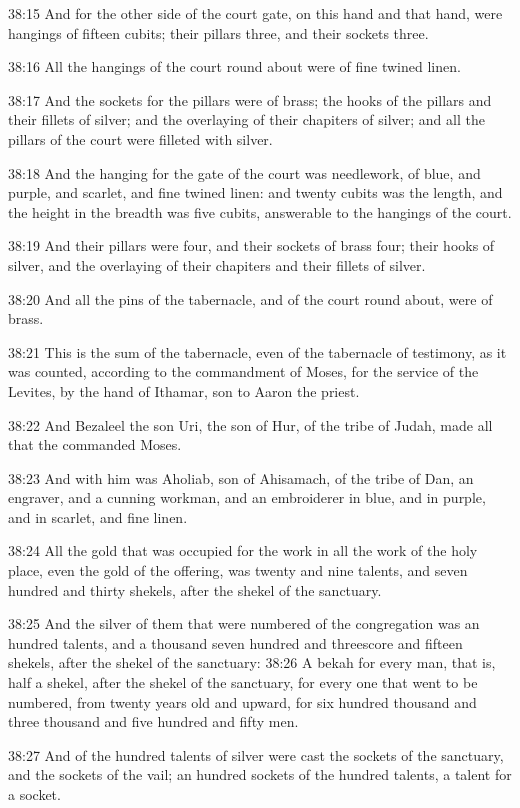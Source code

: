 38:15 And for the other side of the court gate, on this hand and that
hand, were hangings of fifteen cubits; their pillars three, and their
sockets three.

38:16 All the hangings of the court round about were of fine twined
linen.

38:17 And the sockets for the pillars were of brass; the hooks of the
pillars and their fillets of silver; and the overlaying of their
chapiters of silver; and all the pillars of the court were filleted
with silver.

38:18 And the hanging for the gate of the court was needlework, of
blue, and purple, and scarlet, and fine twined linen: and twenty
cubits was the length, and the height in the breadth was five cubits,
answerable to the hangings of the court.

38:19 And their pillars were four, and their sockets of brass four;
their hooks of silver, and the overlaying of their chapiters and their
fillets of silver.

38:20 And all the pins of the tabernacle, and of the court round
about, were of brass.

38:21 This is the sum of the tabernacle, even of the tabernacle of
testimony, as it was counted, according to the commandment of Moses,
for the service of the Levites, by the hand of Ithamar, son to Aaron
the priest.

38:22 And Bezaleel the son Uri, the son of Hur, of the tribe of Judah,
made all that the \LORD commanded Moses.

38:23 And with him was Aholiab, son of Ahisamach, of the tribe of Dan,
an engraver, and a cunning workman, and an embroiderer in blue, and in
purple, and in scarlet, and fine linen.

38:24 All the gold that was occupied for the work in all the work of
the holy place, even the gold of the offering, was twenty and nine
talents, and seven hundred and thirty shekels, after the shekel of the
sanctuary.

38:25 And the silver of them that were numbered of the congregation
was an hundred talents, and a thousand seven hundred and threescore
and fifteen shekels, after the shekel of the sanctuary: 38:26 A bekah
for every man, that is, half a shekel, after the shekel of the
sanctuary, for every one that went to be numbered, from twenty years
old and upward, for six hundred thousand and three thousand and five
hundred and fifty men.

38:27 And of the hundred talents of silver were cast the sockets of
the sanctuary, and the sockets of the vail; an hundred sockets of the
hundred talents, a talent for a socket.

